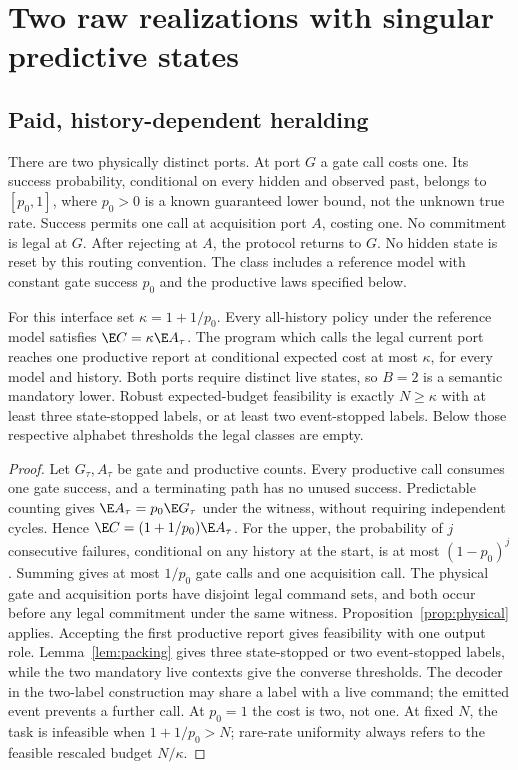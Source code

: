 \section{Two raw realizations with singular predictive states}
\label{sec:raw}
\subsection*{Paid, history-dependent heralding}
There are two physically distinct ports. At port $G$ a gate call costs one. Its success probability, conditional on every hidden and observed past, belongs to $[p_0,1]$, where $p_0>0$ is a known guaranteed lower bound, not the unknown true rate. Success permits one call at acquisition port $A$, costing one. No commitment is legal at $G$. After rejecting at $A$, the protocol returns to $G$. No hidden state is reset by this routing convention. The class includes a reference model with constant gate success $p_0$ and the productive laws specified below.

\begin{lemma}\label{lem:gate}
For this interface set $\kappa=1+1/p_0$. Every all-history policy under the reference model satisfies $\E C=\kappa\E A_\tau$. The program which calls the legal current port reaches one productive report at conditional expected cost at most $\kappa$, for every model and history. Both ports require distinct live states, so $B=2$ is a semantic mandatory lower. Robust expected-budget feasibility is exactly $N\ge\kappa$ with at least three state-stopped labels, or at least two event-stopped labels. Below those respective alphabet thresholds the legal classes are empty.
\end{lemma}
\begin{proof}
Let $G_\tau,A_\tau$ be gate and productive counts. Every productive call consumes one gate success, and a terminating path has no unused success. Predictable counting gives $\E A_\tau=p_0\E G_\tau$ under the witness, without requiring independent cycles. Hence $\E C=(1+1/p_0)\E A_\tau$. For the upper, the probability of $j$ consecutive failures, conditional on any history at the start, is at most $(1-p_0)^j$. Summing gives at most $1/p_0$ gate calls and one acquisition call. The physical gate and acquisition ports have disjoint legal command sets, and both occur before any legal commitment under the same witness. Proposition~\ref{prop:physical} applies. Accepting the first productive report gives feasibility with one output role. Lemma~\ref{lem:packing} gives three state-stopped or two event-stopped labels, while the two mandatory live contexts give the converse thresholds. The decoder in the two-label construction may share a label with a live command; the emitted event prevents a further call. At $p_0=1$ the cost is two, not one. At fixed $N$, the task is infeasible when $1+1/p_0>N$; rare-rate uniformity always refers to the feasible rescaled budget $N/\kappa$.
\end{proof}

